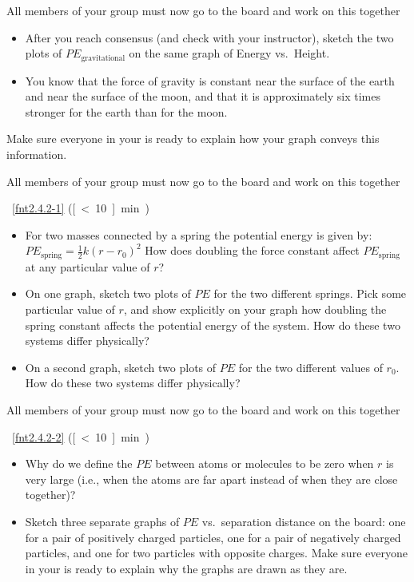 All members of your group must now go to the board and work on this together 

\begin{itemize}
\item After you reach consensus (and check with your instructor), sketch the two plots of $PE_\text{gravitational}$ on the same graph of Energy vs.\ Height.  
\item You know that the force of gravity is constant near the surface of the earth and near the surface of the moon, and that it is approximately six times stronger for the earth than for the moon.  
\end{itemize}
Make sure everyone in your \SG{} is ready to explain how your graph conveys this information.  


All members of your group must now go to the board and work on this together 

\begin{FNTenv}
	
\end{FNTenv}

\FNT~\ref{fnt2.4.2-1}  (\unit[\textless10]{min})  
\begin{itemize}
\item For two masses connected by a spring the potential energy is given by: 
$PE_\text{spring} = \frac{1}{2} k(r-r_0)^2$
How does doubling the force constant affect $PE_\text{spring}$ at any particular value of $r$? 
\item On one graph, sketch two plots of $PE$ for the two different springs. Pick some particular value of $r$, and show explicitly on your graph how doubling the spring constant affects the potential energy of the system. How do these two systems differ physically?
\item On a second graph, sketch two plots of $PE$ for the two different values of $r_0$. How do these two systems differ physically?  
\end{itemize}


All members of your group must now go to the board and work on this together 

\begin{FNTenv}
	
\end{FNTenv}

\FNT~\ref{fnt2.4.2-2}  (\unit[\textless10]{min})  
\begin{itemize}
\item Why do we define the $PE$ between atoms or molecules to be zero when $r$ is very large (i.e., when the atoms are far apart instead of when they are close together)? 
\item Sketch three separate graphs of $PE$ vs.\ separation distance on the board: one for a pair of positively charged particles, one for a pair of negatively charged particles, and one for two particles with opposite charges. Make sure everyone in your \SG{} is ready to explain why the graphs are drawn as they are.
\end{itemize}


\WCD
